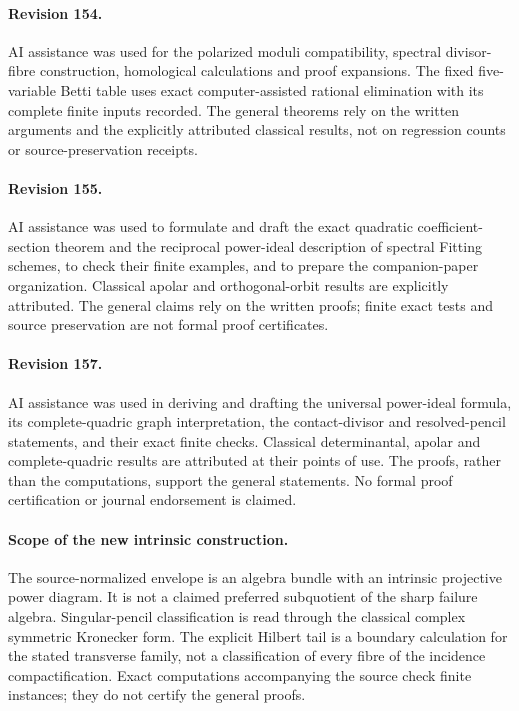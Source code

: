 \documentclass[11pt,reqno]{amsart}
\numberwithin{equation}{section}
\theoremstyle{definition}\newtheorem{definition}[theorem]{Definition}
\theoremstyle{remark}\newtheorem{remark}[theorem]{Remark}
\begin{document}
\paragraph{Revision 154.}
AI assistance was used for the polarized moduli compatibility,
spectral divisor-fibre construction, homological calculations and
proof expansions. The fixed five-variable Betti table uses exact
computer-assisted rational elimination with its complete finite
inputs recorded. The general theorems rely on the written arguments
and the explicitly attributed classical results, not on regression
counts or source-preservation receipts.

\paragraph{Revision 155.}
AI assistance was used to formulate and draft the exact quadratic
coefficient-section theorem and the reciprocal power-ideal description
of spectral Fitting schemes, to check their finite examples, and to
prepare the companion-paper organization.  Classical apolar and
orthogonal-orbit results are explicitly attributed.  The general
claims rely on the written proofs; finite exact tests and source
preservation are not formal proof certificates.

\paragraph{Revision 157.}
AI assistance was used in deriving and drafting the universal power-ideal
formula, its complete-quadric graph interpretation, the contact-divisor
and resolved-pencil statements, and their exact finite checks. Classical
determinantal, apolar and complete-quadric results are attributed at their
points of use. The proofs, rather than the computations, support the
general statements. No formal proof certification or journal endorsement
is claimed.

\paragraph{Scope of the new intrinsic construction.}
The source-normalized envelope is an algebra bundle with an intrinsic
projective power diagram. It is not a claimed preferred subquotient
of the sharp failure algebra. Singular-pencil classification is read
through the classical complex symmetric Kronecker form. The explicit
Hilbert tail is a boundary calculation for the stated transverse
family, not a classification of every fibre of the incidence
compactification. Exact computations accompanying the source check
finite instances; they do not certify the general proofs.
\end{document}
